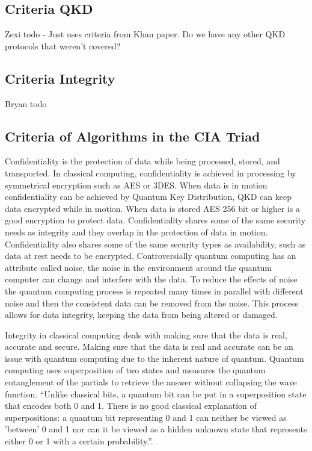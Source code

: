 \documentclass[sigconf]{acmart}
\begin{document}
\subsection{Criteria QKD}
Zexi todo - Just uses criteria from Khan paper. Do we have any other QKD protocols that weren't covered?

\subsection{Criteria Integrity}
Bryan todo

\subsection{Criteria of Algorithms in the CIA Triad} %
Confidentiality is the protection of data while being processed, stored, and transported. %
In classical computing, confidentiality is achieved in processing by symmetrical encryption such as AES or 3DES.
When data is in motion confidentiality can be achieved by Quantum Key Distribution, QKD can keep data encrypted while in motion. %
When data is stored AES 256 bit or higher is a good encryption to protect data. Confidentiality shares some of the same security needs as integrity and they overlap in the protection of data in motion. Confidentiality also shares some of the same security types as availability, such as data at rest needs to be encrypted. Controversially quantum computing has an attribute called noise, the noise in the environment around the quantum computer can change and interfere with the data. To reduce the effects of noise the quantum computing process is repeated many times in parallel with different noise and then the consistent data can be removed from the noise. This process allows for data integrity, keeping the data from being altered or damaged. %

Integrity in classical computing deals with making sure that the data is real, accurate and secure. Making sure that the data is real and accurate can be an issue with quantum computing due to the inherent nature of quantum. Quantum computing uses superposition of two states and measures the quantum entanglement of the partials to retrieve the answer without collapsing the wave function. “Unlike classical bits, a quantum bit can be put in a superposition state that encodes both 0 and 1. There is no good classical explanation of superpositions: a quantum bit representing 0 and 1 can neither be viewed as 'between' 0 and 1 nor can it be viewed as a hidden unknown state that represents either 0 or 1 with a certain probability.”\cite{rieffel_introduction_1998}. 
\end{document}
